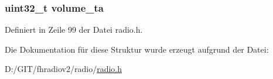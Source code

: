 \subsubsection[{volume\+\_\+ta}]{\setlength{\rightskip}{0pt plus 5cm}uint32\+\_\+t volume\+\_\+ta}\label{structradio__settings_a22b4bf888b705c01b6914d4caaed08dd}


Definiert in Zeile 99 der Datei radio.\+h.



Die Dokumentation für diese Struktur wurde erzeugt aufgrund der Datei\+:\begin{DoxyCompactItemize}
\item 
D\+:/\+G\+I\+T/fhradiov2/radio/\hyperlink{radio_8h}{radio.\+h}\end{DoxyCompactItemize}
